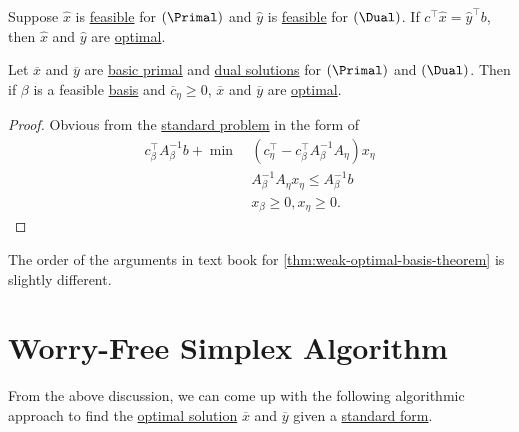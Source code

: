 \begin{corollary}\label{col:lec7-1}
	Suppose \(\hat{x}\) is \hyperref[def:feasible-solution]{feasible} for \((\Primal)\) and \(\hat{y}\) is \hyperref[def:feasible-solution]{feasible} for \((\Dual)\). If
	\(c^{\top}\hat{x} = \hat{y}^{\top} b\), then \(\hat{x}\) and \(\hat{y}\) are \hyperref[def:optimal-solution]{optimal}.
\end{corollary}

\begin{theorem}\label{thm:weak-optimal-basis-theorem}
	Let \(\overline{x}\) and \(\overline{y}\) are \hyperref[def:basic-solution]{basic primal} and \hyperref[def:dual-basic-solution]{dual solutions} for \((\Primal)\) and \((\Dual)\).
	Then if \(\beta\) is a feasible \hyperref[def:basis]{basis} and \(\overline{c}_{\eta}\geq 0\), \(\overline{x}\) and \(\overline{y}\) are \hyperref[def:optimal-solution]{optimal}.
\end{theorem}
\begin{proof}
	Obvious from the \hyperref[def:standard-form]{standard problem} in the form of
	\[
		\begin{aligned}
			c^{\top}_{\beta}A^{-1}_{\beta}b + \min~ & (c_{\eta}^{\top} - c_{\beta}^{\top}A^{-1}_{\beta}A_{\eta})x_{\eta} \\
			                                        & A^{-1}_{\beta}A_{\eta}x_{\eta} \leq A^{-1}_{\beta}b                \\
			                                        & x_{\beta}\geq 0, x_{\eta}\geq 0.
		\end{aligned}
	\]
\end{proof}

\begin{note}
	The order of the arguments in text book for \autoref{thm:weak-optimal-basis-theorem} is slightly different.
\end{note}

\section{Worry-Free Simplex Algorithm}
From the above discussion, we can come up with the following algorithmic approach to find the \hyperref[def:optimal-solution]{optimal solution} \(\overline{x} \) and \(\overline{y} \) given a \hyperref[def:standard-form]{standard form}.

